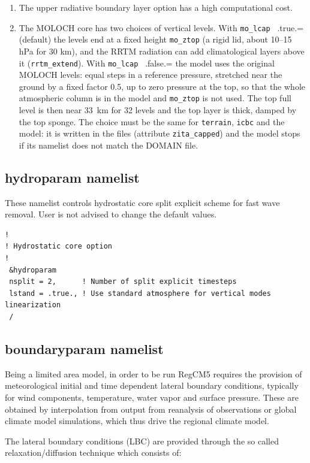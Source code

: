\begin{enumerate}
\item The upper radiative boundary layer option has a high computational cost.
\item The MOLOCH core has two choices of vertical levels. With
\verb=mo_lcap = .true.= (default) the levels end at a fixed height
\verb=mo_ztop= (a rigid lid, about 10--15 hPa for 30 km), and the RRTM
radiation can add climatological layers above it (\verb=rrtm_extend=).
With \verb=mo_lcap = .false.= the model uses the original MOLOCH levels:
equal steps in a reference pressure, stretched near the ground by a fixed
factor 0.5, up to zero pressure at the top, so that the whole atmospheric
column is in the model and \verb=mo_ztop= is not used. The top full level
is then near 33~km for 32 levels and the top layer is thick, damped by the
top sponge. The choice must be the same for \verb=terrain=, \verb=icbc= and
the model: it is written in the files (attribute \verb=zita_capped=) and the
model stops if its namelist does not match the DOMAIN file.
\end{enumerate}

\subsection{hydroparam namelist}

These namelist controls hydrostatic core split explicit scheme for
fast wave removal. User is not advised to change the default values.

{\footnotesize
\begin{Verbatim}
!
! Hydrostatic core option
!
 &hydroparam
 nsplit = 2,      ! Number of split explicit timesteps
 lstand = .true., ! Use standard atmosphere for vertical modes linearization
 /
\end{Verbatim}
}

\subsection{boundaryparam namelist}

Being a limited area model, in order to be run RegCM5 requires the provision
of meteorological initial and time dependent lateral boundary conditions,
typically for wind components, temperature, water vapor and surface pressure.
These are obtained by interpolation from output from reanalysis of observations
or global climate model simulations, which thus drive the regional climate
model.

The lateral boundary conditions (LBC) are provided through the so called
relaxation/diffusion technique which consists of:

